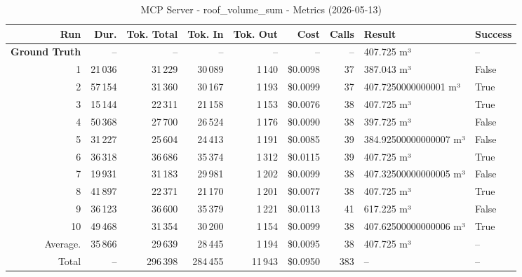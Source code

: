 \documentclass[a4paper,11pt]{article}
\begin{document}
\begin{table}[ht]
\centering
\scriptsize
\caption{MCP Server - roof\_volume\_sum - Metrics (2026-05-13)}
\label{tab:mcp\_roof\_volume\_sum\_metrics\_2026-05-13}
\begin{tabular}{r r r r r r r p{3cm} l}
\hline
Run & Dur. & Tok. Total & Tok. In & Tok. Out & Cost & Calls & Result & Success \\
\hline
\textbf{Ground Truth} & -- & -- & -- & -- & -- & -- & 407.725 m³ & -- \\
\hline
1 & 21\,036 & 31\,229 & 30\,089 & 1\,140 & \$0.0098 & 37 & 387.043 m³ & False \\
2 & 57\,154 & 31\,360 & 30\,167 & 1\,193 & \$0.0099 & 37 & 407.7250000000001 m³ & True \\
3 & 15\,144 & 22\,311 & 21\,158 & 1\,153 & \$0.0076 & 38 & 407.725 m³ & True \\
4 & 50\,368 & 27\,700 & 26\,524 & 1\,176 & \$0.0090 & 38 & 397.725 m³ & False \\
5 & 31\,227 & 25\,604 & 24\,413 & 1\,191 & \$0.0085 & 39 & 384.92500000000007 m³ & False \\
6 & 36\,318 & 36\,686 & 35\,374 & 1\,312 & \$0.0115 & 39 & 407.725 m³ & True \\
7 & 19\,931 & 31\,183 & 29\,981 & 1\,202 & \$0.0099 & 38 & 407.32500000000005 m³ & False \\
8 & 41\,897 & 22\,371 & 21\,170 & 1\,201 & \$0.0077 & 38 & 407.725 m³ & True \\
9 & 36\,123 & 36\,600 & 35\,379 & 1\,221 & \$0.0113 & 41 & 617.225 m³ & False \\
10 & 49\,468 & 31\,354 & 30\,200 & 1\,154 & \$0.0099 & 38 & 407.62500000000006 m³ & True \\
\hline
Average. & 35\,866 & 29\,639 & 28\,445 & 1\,194 & \$0.0095 & 38 & 407.725 m³ & -- \\
Total & -- & 296\,398 & 284\,455 & 11\,943 & \$0.0950 & 383 & -- & -- \\
\hline
\end{tabular}
\end{table}

\clearpage
\end{document}
